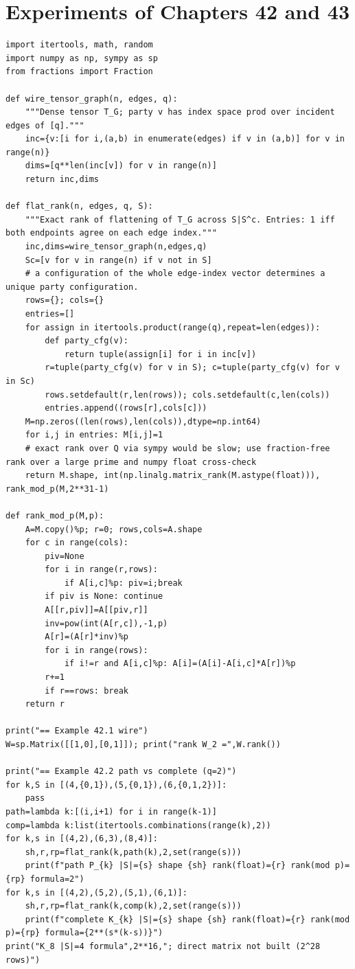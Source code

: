 \documentclass[11pt,letterpaper]{report}
\theoremstyle{plain}
\theoremstyle{definition}
\theoremstyle{remark}
\begin{document}
\section{Experiments of Chapters 42 and 43}

\begin{Verbatim}[fontsize=\scriptsize,breaklines=true,breakanywhere=true,frame=single]
import itertools, math, random
import numpy as np, sympy as sp
from fractions import Fraction

def wire_tensor_graph(n, edges, q):
    """Dense tensor T_G; party v has index space prod over incident edges of [q]."""
    inc={v:[i for i,(a,b) in enumerate(edges) if v in (a,b)] for v in range(n)}
    dims=[q**len(inc[v]) for v in range(n)]
    return inc,dims

def flat_rank(n, edges, q, S):
    """Exact rank of flattening of T_G across S|S^c. Entries: 1 iff both endpoints agree on each edge index."""
    inc,dims=wire_tensor_graph(n,edges,q)
    Sc=[v for v in range(n) if v not in S]
    # a configuration of the whole edge-index vector determines a unique party configuration.
    rows={}; cols={}
    entries=[]
    for assign in itertools.product(range(q),repeat=len(edges)):
        def party_cfg(v):
            return tuple(assign[i] for i in inc[v])
        r=tuple(party_cfg(v) for v in S); c=tuple(party_cfg(v) for v in Sc)
        rows.setdefault(r,len(rows)); cols.setdefault(c,len(cols))
        entries.append((rows[r],cols[c]))
    M=np.zeros((len(rows),len(cols)),dtype=np.int64)
    for i,j in entries: M[i,j]=1
    # exact rank over Q via sympy would be slow; use fraction-free rank over a large prime and numpy float cross-check
    return M.shape, int(np.linalg.matrix_rank(M.astype(float))), rank_mod_p(M,2**31-1)

def rank_mod_p(M,p):
    A=M.copy()%p; r=0; rows,cols=A.shape
    for c in range(cols):
        piv=None
        for i in range(r,rows):
            if A[i,c]%p: piv=i;break
        if piv is None: continue
        A[[r,piv]]=A[[piv,r]]
        inv=pow(int(A[r,c]),-1,p)
        A[r]=(A[r]*inv)%p
        for i in range(rows):
            if i!=r and A[i,c]%p: A[i]=(A[i]-A[i,c]*A[r])%p
        r+=1
        if r==rows: break
    return r

print("== Example 42.1 wire")
W=sp.Matrix([[1,0],[0,1]]); print("rank W_2 =",W.rank())

print("== Example 42.2 path vs complete (q=2)")
for k,S in [(4,{0,1}),(5,{0,1}),(6,{0,1,2})]:
    pass
path=lambda k:[(i,i+1) for i in range(k-1)]
comp=lambda k:list(itertools.combinations(range(k),2))
for k,s in [(4,2),(6,3),(8,4)]:
    sh,r,rp=flat_rank(k,path(k),2,set(range(s)))
    print(f"path P_{k} |S|={s} shape {sh} rank(float)={r} rank(mod p)={rp} formula=2")
for k,s in [(4,2),(5,2),(5,1),(6,1)]:
    sh,r,rp=flat_rank(k,comp(k),2,set(range(s)))
    print(f"complete K_{k} |S|={s} shape {sh} rank(float)={r} rank(mod p)={rp} formula={2**(s*(k-s))}")
print("K_8 |S|=4 formula",2**16,"; direct matrix not built (2^28 rows)")


\end{Verbatim}
\end{document}
